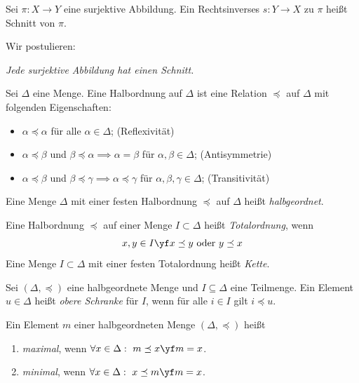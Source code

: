 \documentclass[11pt, a4paper]{article}
\begin{document}
\begin{definition}[Schnitt]\Theorem
    Sei $\pi : X\to Y$ eine surjektive Abbildung. Ein Rechtsinverses $s:Y\to X$ zu $\pi$ heißt Schnitt von $\pi$. 
\end{definition}
Wir postulieren:\bigskip

{}
 \textit{Jede surjektive Abbildung hat einen Schnitt.} \label{Auswahlaxiom}

\vspace{0.3cm}
\begin{definition}[Halbordnung]
    Sei $\Delta$ eine Menge. Eine Halbordnung auf $\Delta$ ist eine Relation $\preceq$ auf $\Delta$ mit folgenden Eigenschaften:
    \begin{itemize}
        \item[]  $\alpha \preceq \alpha$ für alle $\alpha \in \Delta$; \hfill (Reflexivität)
        \item[]  $\alpha \preceq \beta$ und $\beta \preceq \alpha \implies \alpha = \beta$ für $\alpha, \beta \in \Delta$; \hfill (Antisymmetrie)
        \item[] $\alpha \preceq \beta$ und $\beta \preceq \gamma \implies \alpha \preceq \gamma$ für $\alpha, \beta, \gamma \in \Delta$; \hfill (Transitivität) 
    \end{itemize}
    Eine Menge $\Delta$ mit einer festen Halbordnung $\preceq$ auf $\Delta$ heißt \emph{halbgeordnet}.
\end{definition}

\begin{definition}[Totalordnung] 
    Eine Halbordnung $\preceq$ auf einer Menge $I \subset \Delta$ heißt \emph{Totalordnung}, wenn
    $$x,y\in I \yf x\preceq y \text{ oder } y\preceq x$$
    Eine Menge $I\subset \Delta $ mit einer festen Totalordnung heißt \emph{Kette}.
\end{definition}

\begin{definition}
    Sei $(\Delta, \preceq)$ eine halbgeordnete Menge und $I \subseteq \Delta$ eine Teilmenge. Ein Element $u \in \Delta$ heißt \emph{obere Schranke} für $I$, wenn für alle $i \in I$ gilt $i \preceq u$.\bigskip 
    
    Ein Element $m$ einer halbgeordneten Menge $(\Delta, \preceq)$ heißt \begin{enumerate}
        \item[] \emph{maximal}, wenn $ \forall x \in \Delta:\ m \preceq x \yf m = x$. 
        \item[]\emph{minimal}, wenn $\forall x \in \Delta: \ x \preceq m \yf m = x$.
    \end{enumerate}
\end{definition}
\end{document}
